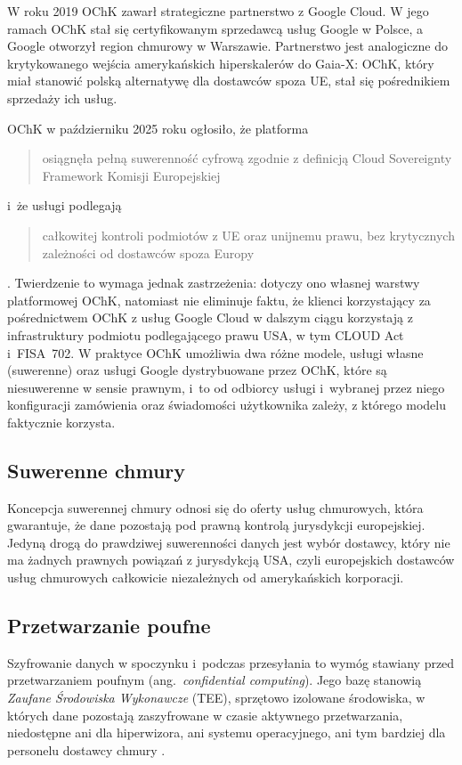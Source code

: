 W roku 2019 OChK zawarł strategiczne partnerstwo z Google Cloud. W jego ramach OChK stał się certyfikowanym sprzedawcą usług Google w Polsce, a Google otworzył region chmurowy w Warszawie. Partnerstwo jest analogiczne do krytykowanego wejścia amerykańskich hiperskalerów do Gaia-X: OChK, który miał stanowić polską alternatywę dla dostawców spoza UE, stał się pośrednikiem sprzedaży ich usług.

OChK w październiku 2025 roku ogłosiło, że platforma \blockquote{osiągnęła pełną suwerenność cyfrową zgodnie z definicją Cloud Sovereignty Framework Komisji Europejskiej} i~że usługi podlegają \blockquote{całkowitej kontroli podmiotów z UE oraz unijnemu prawu, bez krytycznych zależności od dostawców spoza Europy}\autocite{ochk2025sovereignty}. Twierdzenie to wymaga jednak zastrzeżenia: dotyczy ono własnej warstwy platformowej OChK, natomiast nie eliminuje faktu, że klienci korzystający za pośrednictwem OChK z usług Google Cloud w dalszym ciągu korzystają z infrastruktury podmiotu podlegającego prawu USA, w tym CLOUD Act i~FISA~702. W praktyce OChK umożliwia dwa różne modele, usługi własne (suwerenne) oraz usługi Google dystrybuowane przez OChK, które są niesuwerenne w sensie prawnym, i~to od odbiorcy usługi i~wybranej przez niego konfiguracji zamówienia oraz świadomości użytkownika zależy, z którego modelu faktycznie korzysta.

\subsection*{Suwerenne chmury}

Koncepcja suwerennej chmury odnosi się do oferty usług chmurowych, która gwarantuje, że dane pozostają pod prawną kontrolą jurysdykcji europejskiej. Jedyną drogą do prawdziwej suwerenności danych jest wybór dostawcy, który nie ma żadnych prawnych powiązań z jurysdykcją USA, czyli europejskich dostawców usług chmurowych całkowicie niezależnych od amerykańskich korporacji.

\subsection*{Przetwarzanie poufne}

Szyfrowanie danych w spoczynku i~podczas przesyłania to wymóg stawiany przed przetwarzaniem poufnym (ang.\ \textit{confidential computing}). Jego bazę stanowią \textit{Zaufane Środowiska Wykonawcze} (TEE), sprzętowo izolowane środowiska, w których dane pozostają zaszyfrowane w czasie aktywnego przetwarzania, niedostępne ani dla hiperwizora, ani systemu operacyjnego, ani tym bardziej dla personelu dostawcy chmury \autocite{ijaibdcms2024tee}.

